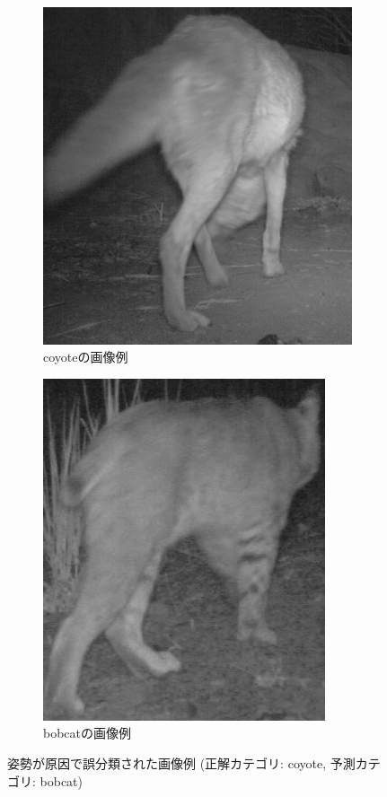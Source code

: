 \documentclass[a4paper,11pt,nomag]{jsreport}
\begin{document}
\begin{figure}[tbp]
  \centering
  \begin{subfigure}[b]{0.45\linewidth}
    \centering
    \includegraphics[height=0.9\linewidth, keepaspectratio]{image/coyote.png}
    \caption{coyoteの画像例}
    \label{fig:coyote}
  \end{subfigure}
  \hfill
  \begin{subfigure}[b]{0.45\linewidth}
    \centering
    \includegraphics[height=0.9\linewidth, keepaspectratio]{image/bobcat.png}
    \caption{bobcatの画像例}
    \label{fig:bobcat}
  \end{subfigure}
  \caption{姿勢が原因で誤分類された画像例 (正解カテゴリ: coyote, 予測カテゴリ: bobcat)}
  \label{fig:animalback}
\end{figure}



\end{document}
